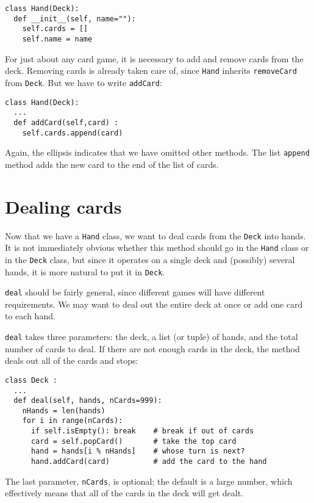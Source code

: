 \beforeverb
\begin{verbatim}
class Hand(Deck):
  def __init__(self, name=""):
    self.cards = []
    self.name = name
\end{verbatim}
\afterverb
%
For just about any card game, it is necessary to add and
remove cards from the deck.  Removing cards is already taken
care of, since {\tt Hand} inherits {\tt removeCard} from {\tt Deck}.
But we have to write {\tt addCard}:

\beforeverb
\begin{verbatim}
class Hand(Deck):
  ...
  def addCard(self,card) :
    self.cards.append(card)
\end{verbatim}
\afterverb
%
Again, the ellipsis indicates that we have omitted other methods.
The list {\tt append} method adds the new card to
the end of the list of cards.


\section{Dealing cards}

Now that we have a {\tt Hand} class, we want to deal cards from the
{\tt Deck} into hands.  It is not immediately obvious whether this
method should go in the {\tt Hand} class or in the {\tt Deck} class,
but since it operates on a single deck and (possibly) several hands,
it is more natural to put it in {\tt Deck}.

{\tt deal} should be fairly general,
since different games will have different requirements.  We may want
to deal out the entire deck at once or add one card to each hand.

{\tt deal} takes three parameters: the deck, a list (or tuple) of
hands, and the total number of cards to deal.  If there are not enough
cards in the deck, the method deals out all of the cards and stops:

\beforeverb
\begin{verbatim}
class Deck :
  ...
  def deal(self, hands, nCards=999):
    nHands = len(hands)
    for i in range(nCards):
      if self.isEmpty(): break    # break if out of cards
      card = self.popCard()       # take the top card
      hand = hands[i % nHands]    # whose turn is next?
      hand.addCard(card)          # add the card to the hand
\end{verbatim}
\afterverb
%
The last parameter, {\tt nCards}, is optional; the default is a large
number, which effectively means that all of the cards in the deck
will get dealt.

